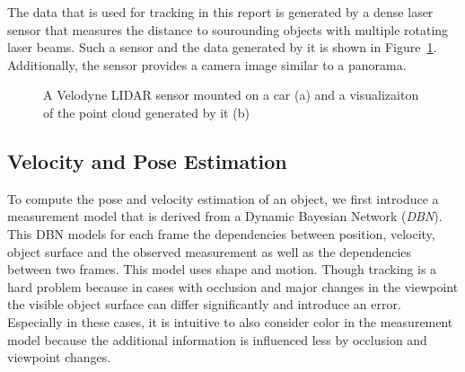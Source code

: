 \documentclass[twoside,a4paper,article]{combine}
\begin{document}
The data that is used for tracking in this report is generated by a
dense laser sensor that measures the distance to sourounding objects
with multiple rotating laser beams. Such a sensor and the data
generated by it is shown in Figure~\ref{fig:lidar}. Additionally, the
sensor provides a camera image similar to a panorama.
\begin{figure}
  \label{fig:lidar}
  \center
  
  \caption{A Velodyne LIDAR sensor mounted on a car (a) and a
    visualizaiton of the point cloud generated by it
    (b)~\cite{arbitrary-object-recognition}}
\end{figure}

\subsection{Velocity and Pose Estimation}
\label{sub:vel-and-pos-estimation}
To compute the pose and velocity estimation of an object, we first
introduce a measurement model that is derived from a Dynamic Bayesian
Network (\textit{DBN}). This DBN models for each frame the
dependencies between position, velocity, object surface and the
observed measurement as well as the dependencies between two
frames. This model uses shape and motion. Though tracking is a hard
problem because in cases with occlusion and major changes in the
viewpoint the visible object surface can differ significantly and
introduce an error. Especially in these cases, it is intuitive to also
consider color in the measurement model because the additional
information is influenced less by occlusion and viewpoint changes.
\end{document}
